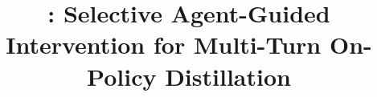 \documentclass[11pt]{article}
\title{\ours: Selective Agent-Guided Intervention for Multi-Turn On-Policy Distillation}
\theoremstyle{plain}
\theoremstyle{definition}
\theoremstyle{remark}
\begin{document}
\maketitle
\begin{abstract}

\end{abstract}

\setcounter{footnote}{0}









\appendix


\end{document}

